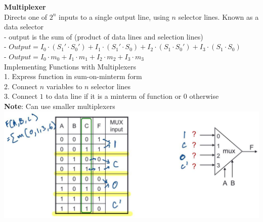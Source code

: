 \documentclass[10pt, a4paper]{article}
\newcommand{\highlight}[1]{{\color{red}\textbf{#1}}}
\newcommand{\red}[1]{{\color{red}#1}}
\begin{document}
\begin{multicols*}{3}
		\textbf{Multiplexer}\\
		Directs one of $2^n$ inputs to a single output line, using $n$ selector lines. Known as a \red{data selector}\\
		- output is the sum of (product of data lines and selection lines)\\
		- $Output = I_0 \cdot (S_1' \cdot S_0') + I_1 \cdot (S_1' \cdot S_0) + I_2 \cdot (S_1 \cdot S_0') + I_3 \cdot (S_1 \cdot S_0)$\\
		- $Output = I_0 \cdot m_0 + I_1 \cdot m_1 + I_2 \cdot m_2 + I_3 \cdot m_3$\\

		Implementing Functions with Multiplexers\\
		1. Express function in sum-on-minterm form\\
		2. Connect $n$ variables to $n$ selector lines\\
		3. Connect $1$ to data line if it is a minterm of function or $0$ otherwise\\
		\highlight{Note}: Can use smaller multiplexers\\
		\includegraphics[scale=.2]{./assets/smallerMux}


\end{multicols*}
\end{document}
